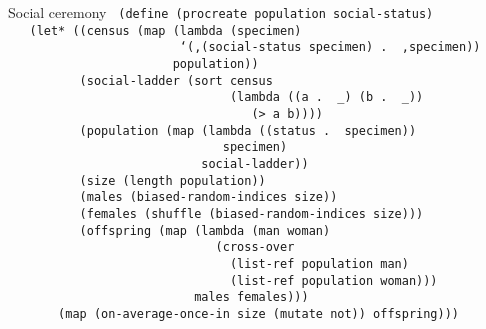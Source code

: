 \documentclass{beamer}
\begin{document}
\begin{frame}{Social ceremony}
  \texttt{\scriptsize
(define (procreate population social-status)\\ \pause
\ \ \ (let* ((census (map (lambda (specimen)\\
\ \ \ \ \ \ \ \ \ \ \ \ \ \ \ \ \ \ \ \ \ \ \ \
`(,(social-status specimen)\,.\,\,,specimen))\\
\ \ \ \ \ \ \ \ \ \ \ \ \ \ \ \ \ \ \ \ \ \ \ population))\\ \pause
\ \ \ \ \ \ \ \ \ \ (social-ladder (sort census \\
\ \ \ \ \ \ \ \ \ \ \ \ \ \ \ \ \ \ \ \ \ \ \ \ \ \ \ \ \ \ \ 
(lambda ((a .\,\,\_) (b .\,\,\_))\\
\ \ \ \ \ \ \ \ \ \ \ \ \ \ \ \ \ \ \ \ \ \ \ \ \ \ \ \ \ \ \ \ \ \
(> a b))))\\ \pause
\ \ \ \ \ \ \ \ \ \ (population (map (lambda ((status .\,\,specimen))\\
\ \ \ \ \ \ \ \ \ \ \ \ \ \ \ \ \ \ \ \ \ \ \ \ \ \ \ \ \ \ specimen)\\
\ \ \ \ \ \ \ \ \ \ \ \ \ \ \ \ \ \ \ \ \ \ \ \ \ \ \ social-ladder))\\ \pause
\ \ \ \ \ \ \ \ \ \ (size (length population))\\ \pause
\ \ \ \ \ \ \ \ \ \ (males (biased-random-indices size))\\ \pause
\ \ \ \ \ \ \ \ \ \ (females (shuffle (biased-random-indices size)))\\ \pause
\ \ \ \ \ \ \ \ \ \ (offspring (map (lambda (man woman)\\
\ \ \ \ \ \ \ \ \ \ \ \ \ \ \ \ \ \ \ \ \ \ \ \ \ \ \ \ \
(cross-over \\
\ \ \ \ \ \ \ \ \ \ \ \ \ \ \ \ \ \ \ \ \ \ \ \ \ \ \ \ \ \ \
(list-ref population man)\\
\ \ \ \ \ \ \ \ \ \ \ \ \ \ \ \ \ \ \ \ \ \ \ \ \ \ \ \ \ \ \
(list-ref population woman)))\\
\ \ \ \ \ \ \ \ \ \ \ \ \ \ \ \ \ \ \ \ \ \ \ \ \ \
males females)))\\ \pause
\ \ \ \ \ \ \ (map (on-average-once-in size (mutate not)) offspring)))
}
\end{frame}
\end{document}
